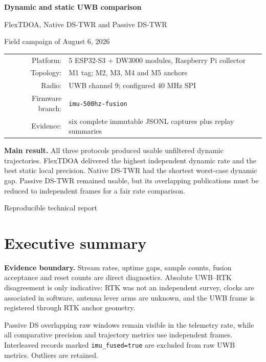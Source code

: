 \documentclass[10pt,a4paper]{article}
\begin{document}
\begin{titlepage}
\centering
\vspace*{18mm}
{\Huge\bfseries Dynamic and static UWB comparison\par}
\vspace{4mm}
{\Large FlexTDOA, Native DS-TWR and Passive DS-TWR\par}
\vspace{14mm}
{\large Field campaign of August 6, 2026\par}
\vspace{12mm}
\begin{tabular}{rl}
Platform: & 5 ESP32-S3 + DW3000 modules, Raspberry Pi collector\\
Topology: & M1 tag; M2, M3, M4 and M5 anchors\\
Radio: & UWB channel 9; configured 40 MHz SPI\\
Firmware branch: & \texttt{imu-500hz-fusion}\\
Evidence: & six complete immutable JSONL captures plus replay summaries\\
\end{tabular}
\vfill
\colorbox{info}{\parbox{0.88\textwidth}{\vspace{2mm}
\textbf{Main result.} All three protocols produced usable unfiltered dynamic
trajectories. FlexTDOA delivered the highest independent dynamic rate and the
best static local precision. Native DS-TWR had the shortest worst-case dynamic
gap. Passive DS-TWR remained usable, but its overlapping publications must be
reduced to independent frames for a fair rate comparison.\vspace{2mm}}}
\vfill
{\large Reproducible technical report\par}
\end{titlepage}
\tableofcontents
\clearpage
{}

\section{Executive summary}
\colorbox{warning}{\parbox{0.96\textwidth}{\textbf{Evidence boundary.}
Stream rates, uptime gaps, sample counts, fusion acceptance and reset counts are
direct diagnostics. Absolute UWB--RTK disagreement is only indicative: RTK was
not an independent survey, clocks are associated in software, antenna lever
arms are unknown, and the UWB frame is registered through RTK anchor geometry.}}

Passive DS overlapping raw windows remain visible in the telemetry rate, while
all comparative precision and trajectory metrics use independent frames.
Interleaved records marked \texttt{imu\_fused=true} are excluded from raw UWB
metrics. Outliers are retained.
\end{document}

